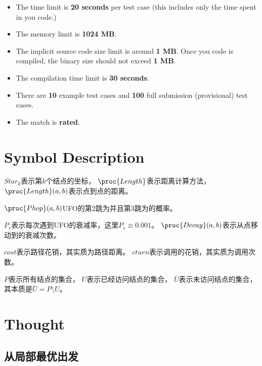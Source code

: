 \documentclass[hyperref,UTF8]{ctexart}
\theoremstyle{definition}
\theoremstyle{remark}
\numberwithin{equation}{subsection}
\newcommand{\Emph}{\textbf}
\begin{document}
	\begin{itemize}
	
		\item The time limit is \Emph{20 seconds} per test case (this includes only the time spent in you code.)
		
		\item The memory limit is \Emph{1024 MB}.
		
		\item The implicit source code size limit is around \Emph{1 MB}.
		Once you code is compiled, the binary size should not exceed \Emph{1 MB}.
		
		\item The compilation time limit is \Emph{30 seconds}.
		
		\item There are \Emph{10} example test cases and \Emph{100} full submission (provisional) test cases.

		\item The match is \Emph{rated}.
		
	\end{itemize}
	
\section{Symbol Description}
\label{sec:symbol_descrip}

	$Star_k$表示第$k$个结点的坐标，
	$\proc{Length}$表示距离计算方法，
	$\proc{Length}(a, b)$表示点到点的距离。
	
	$\proc{Phop}(a, b)$UFO的第2跳为并且第3跳为的概率。
	
	$P_r$表示每次遇到UFO的衰减率，这里$P_r \equiv 0.001$。
	$\proc{Decay}(a, b)$表示从点移动到的衰减次数。
	
	$cost$表示路径花销，其实质为路径距离。
	$cturn$表示调用的花销，其实质为调用次数。
	
    $P$表示所有结点的集合，
	$U$表示已经访问结点的集合，
	$\bar{U}$表示未访问结点的集合，
	其本质是$\bar{U} = P \setminus U$。
	
\section{Thought}
\label{sec:thought}

\subsection{从局部最优出发}
\label{subsec:local_optimum}
\end{document}
